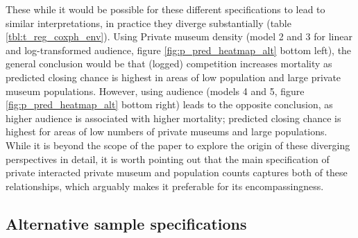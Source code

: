 \documentclass[12pt]{article}
\begin{document}
These while it would be possible for these different specifications to lead to similar interpretations, in practice they diverge substantially (table \ref{tbl:t_reg_coxph_env}).
Using Private museum density (model 2 and 3 for linear and log-transformed audience, figure \ref{fig:p_pred_heatmap_alt} bottom left), the general conclusion would be that (logged) competition increases mortality as predicted closing chance is highest in areas of low population and large private museum populations.
However, using audience (models 4 and 5, figure \ref{fig:p_pred_heatmap_alt} bottom right) leads to the opposite conclusion, as higher audience is associated with higher mortality; predicted closing chance is highest for areas of low numbers of private museums and large populations.
While it is beyond the scope of the paper to explore the origin of these diverging perspectives in detail, it is worth pointing out that the main specification of private interacted private museum and population counts captures both of these relationships, which arguably makes it preferable for its encompassingness.
\subsection*{Alternative sample specifications}
\label{sec:org9b637b1}
\end{document}
